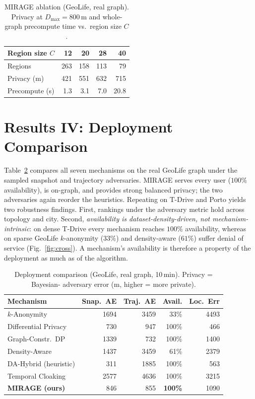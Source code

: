 \documentclass[10pt,journal,compsoc]{IEEEtran}
\begin{document}
\begin{table}[t]\centering
\caption{MIRAGE ablation (GeoLife, real graph). Privacy at $D_{\max}{=}800$\,m and
whole-graph precompute time vs.\ region size $C$.}
\label{tab:ablation}
\begin{tabular}{lrrrr}
\toprule
Region size $C$ & 12 & 20 & 28 & 40 \\
\midrule
Regions & 263 & 158 & 113 & 79 \\
Privacy (m) & 421 & 551 & 632 & 715 \\
Precompute (s) & 1.3 & 3.1 & 7.0 & 20.8 \\
\bottomrule
\end{tabular}
\end{table}

\section{Results IV: Deployment Comparison}
\label{sec:deploy}
Table~\ref{tab:main} compares all seven mechanisms on the real GeoLife graph under
the sampled snapshot and trajectory adversaries. MIRAGE serves every user ($100\%$
availability), is on-graph, and provides strong balanced privacy; the two
adversaries again reorder the heuristics. Repeating on T-Drive and Porto yields two
robustness findings. First, rankings under the adversary metric hold across topology
and city. Second, \emph{availability is dataset-density-driven, not
mechanism-intrinsic}: on dense T-Drive every mechanism reaches $100\%$ availability,
whereas on sparse GeoLife $k$-anonymity ($33\%$) and density-aware ($61\%$) suffer
denial of service (Fig.~\ref{fig:cross}). A mechanism's availability is therefore a
property of the deployment as much as of the algorithm.

\begin{table}[t]\centering
\caption{Deployment comparison (GeoLife, real graph, 10\,min). Privacy = Bayesian-
adversary error (m, higher = more private).}
\label{tab:main}
\begin{tabular}{lrrrr}
\toprule
Mechanism & Snap.\ AE & Traj.\ AE & Avail. & Loc.\ Err \\
\midrule
$k$-Anonymity & 1694 & 3459 & 33\% & 4493 \\
Differential Privacy & 730 & 947 & 100\% & 466 \\
Graph-Constr.\ DP & 1339 & 732 & 100\% & 1400 \\
Density-Aware & 1437 & 3459 & 61\% & 2379 \\
DA-Hybrid (heuristic) & 311 & 1885 & 100\% & 563 \\
Temporal Cloaking & 2577 & 4636 & 100\% & 3215 \\
\textbf{MIRAGE (ours)} & 846 & 855 & \textbf{100\%} & 1090 \\
\bottomrule
\end{tabular}
\end{table}
\end{document}
